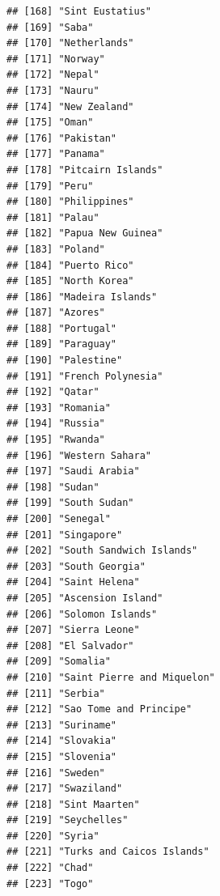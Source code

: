 \documentclass[
]{article}
\begin{document}
\begin{verbatim}
## [168] "Sint Eustatius"                     
## [169] "Saba"                               
## [170] "Netherlands"                        
## [171] "Norway"                             
## [172] "Nepal"                              
## [173] "Nauru"                              
## [174] "New Zealand"                        
## [175] "Oman"                               
## [176] "Pakistan"                           
## [177] "Panama"                             
## [178] "Pitcairn Islands"                   
## [179] "Peru"                               
## [180] "Philippines"                        
## [181] "Palau"                              
## [182] "Papua New Guinea"                   
## [183] "Poland"                             
## [184] "Puerto Rico"                        
## [185] "North Korea"                        
## [186] "Madeira Islands"                    
## [187] "Azores"                             
## [188] "Portugal"                           
## [189] "Paraguay"                           
## [190] "Palestine"                          
## [191] "French Polynesia"                   
## [192] "Qatar"                              
## [193] "Romania"                            
## [194] "Russia"                             
## [195] "Rwanda"                             
## [196] "Western Sahara"                     
## [197] "Saudi Arabia"                       
## [198] "Sudan"                              
## [199] "South Sudan"                        
## [200] "Senegal"                            
## [201] "Singapore"                          
## [202] "South Sandwich Islands"             
## [203] "South Georgia"                      
## [204] "Saint Helena"                       
## [205] "Ascension Island"                   
## [206] "Solomon Islands"                    
## [207] "Sierra Leone"                       
## [208] "El Salvador"                        
## [209] "Somalia"                            
## [210] "Saint Pierre and Miquelon"          
## [211] "Serbia"                             
## [212] "Sao Tome and Principe"              
## [213] "Suriname"                           
## [214] "Slovakia"                           
## [215] "Slovenia"                           
## [216] "Sweden"                             
## [217] "Swaziland"                          
## [218] "Sint Maarten"                       
## [219] "Seychelles"                         
## [220] "Syria"                              
## [221] "Turks and Caicos Islands"           
## [222] "Chad"                               
## [223] "Togo"                               

\end{verbatim}
\end{document}
